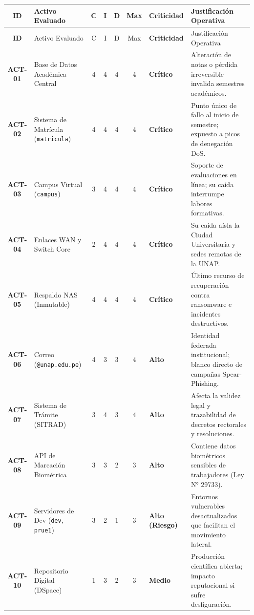 \begin{center}
\scriptsize
\setlength{\tabcolsep}{3.5pt}
\renewcommand{\arraystretch}{1.2}
\begin{longtable}{>{\bfseries}c p{3.4cm} c c c c >{\bfseries}p{1.7cm} p{4.6cm}}
\toprule
\rowcolor{outermarginbgcolor}
ID & Activo Evaluado & C & I & D & Max & Criticidad & Justificación Operativa \\
\midrule
\endfirsthead
\toprule
\rowcolor{outermarginbgcolor}
ID & Activo Evaluado & C & I & D & Max & Criticidad & Justificación Operativa \\
\midrule
\endhead
\bottomrule
\endfoot
ACT-01 & Base de Datos Académica Central & 4 & 4 & 4 & 4 & Crítico & Alteración de notas o pérdida irreversible invalida semestres académicos. \\
\midrule
ACT-02 & Sistema de Matrícula (\texttt{matricula}) & 4 & 4 & 4 & 4 & Crítico & Punto único de fallo al inicio de semestre; expuesto a picos de denegación DoS. \\
\midrule
ACT-03 & Campus Virtual (\texttt{campus}) & 3 & 4 & 4 & 4 & Crítico & Soporte de evaluaciones en línea; su caída interrumpe labores formativas. \\
\midrule
ACT-04 & Enlaces WAN y Switch Core & 2 & 4 & 4 & 4 & Crítico & Su caída aísla la Ciudad Universitaria y sedes remotas de la UNAP. \\
\midrule
ACT-05 & Respaldo NAS (Inmutable) & 4 & 4 & 4 & 4 & Crítico & Último recurso de recuperación contra ransomware e incidentes destructivos. \\
\midrule
ACT-06 & Correo (\texttt{@unap.edu.pe}) & 4 & 3 & 3 & 4 & Alto & Identidad federada institucional; blanco directo de campañas Spear-Phishing. \\
\midrule
ACT-07 & Sistema de Trámite (SITRAD) & 3 & 4 & 3 & 4 & Alto & Afecta la validez legal y trazabilidad de decretos rectorales y resoluciones. \\
\midrule
ACT-08 & API de Marcación Biométrica & 3 & 3 & 2 & 3 & Alto & Contiene datos biométricos sensibles de trabajadores (Ley N° 29733). \\
\midrule
ACT-09 & Servidores de Dev (\texttt{dev}, \texttt{prue1}) & 3 & 2 & 1 & 3 & Alto (Riesgo) & Entornos vulnerables desactualizados que facilitan el movimiento lateral. \\
\midrule
ACT-10 & Repositorio Digital (DSpace) & 1 & 3 & 2 & 3 & Medio & Producción científica abierta; impacto reputacional si sufre desfiguración. \\
\bottomrule
\end{longtable}
\end{center}

